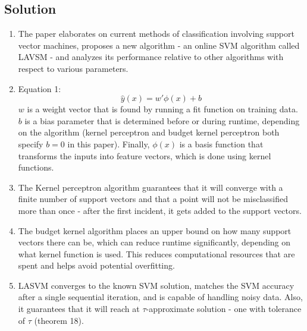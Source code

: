 \documentclass[submit]{harvardml}
\begin{document}
\subsection*{Solution}
\begin{enumerate}
	\item The paper elaborates on current methods of classification involving support vector machines, proposes
		a new algorithm - an online SVM algorithm called LAVSM - and analyzes its performance relative to 
		other algorithms with respect to various parameters. 
	\item Equation 1:
		$$\hat{y}(x) = w'\phi(x) + b$$
		$w$ is a weight vector that is found by running a fit function on training data. $b$ is a bias parameter 
		that is determined before or during runtime, depending on the algorithm (kernel perceptron 
		and budget kernel perceptron both specify $b = 0$ in this paper). Finally, $\phi(x)$ is a basis function
		that transforms the inputs into feature vectors, which is done using kernel functions. 
	\item The Kernel perceptron algorithm guarantees that it will converge with a finite number of support vectors and 
		that a point will not be misclassified more than once - after the first incident, it gets added to the support 
		vectors. 
	\item The budget kernel algorithm places an upper bound on how many support vectors there can be, which
		can reduce runtime significantly, depending on what kernel function is used. This reduces computational
		resources that are spent and helps avoid potential overfitting. 
	\item LASVM converges to the known SVM solution, matches the SVM accuracy after a single sequential iteration,
		and is capable of handling noisy data. Also, it guarantees that it will reach at $\tau$-approximate solution - one
		with tolerance of $\tau$ (theorem 18). 
\end{enumerate}
\end{document}
